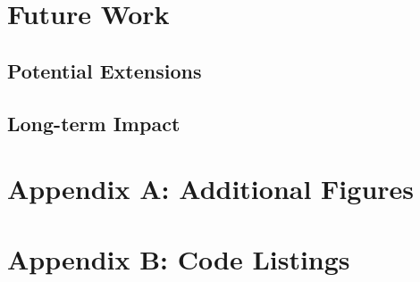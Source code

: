 \documentclass[11pt]{report}
\begin{document}
\chapter{Future Work}
\section{Potential Extensions}
\section{Long-term Impact}

\appendix
\chapter{Appendix A: Additional Figures}
\chapter{Appendix B: Code Listings}



\end{document}
